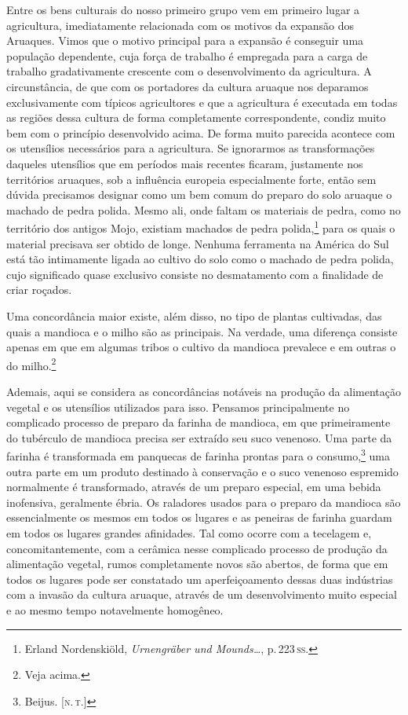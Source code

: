Entre os bens culturais do nosso primeiro grupo vem em primeiro lugar a
agricultura, imediatamente relacionada com os motivos da expansão dos
Aruaques. Vimos que o motivo principal para a expansão é conseguir uma
população dependente, cuja força de trabalho é empregada para a carga de
trabalho gradativamente crescente com o desenvolvimento da agricultura.
A circunstância, de que com os portadores da cultura aruaque nos
deparamos exclusivamente com típicos agricultores e que a agricultura é
executada em todas as regiões dessa cultura de forma completamente
correspondente, condiz muito bem com o princípio desenvolvido acima. De
forma muito parecida acontece com os utensílios necessários para a
agricultura. Se ignorarmos as transformações daqueles utensílios que em
períodos mais recentes ficaram, justamente nos territórios aruaques, sob
a influência europeia especialmente forte, então sem dúvida precisamos
designar como um bem comum do preparo do solo aruaque o machado de pedra
polida. Mesmo ali, onde faltam os materiais de pedra, como no território
dos antigos Mojo, existiam machados de pedra polida,\footnote{Erland
  Nordenskiöld, \textit{Urnengräber und Mounds\ldots}, p.\,223\,\textsc{ss}.} 
  para os quais o material precisava ser obtido de
longe. Nenhuma ferramenta na América do Sul está tão intimamente ligada
ao cultivo do solo como o machado de pedra polida, cujo significado
quase exclusivo consiste no desmatamento com a finalidade de criar
roçados.

Uma concordância maior existe, além disso, no tipo de plantas
cultivadas, das quais a mandioca e o milho são as principais. Na
verdade, uma diferença consiste apenas em que em algumas tribos o
cultivo da mandioca prevalece e em outras o do milho.\footnote{Veja
  acima.}

Ademais, aqui se considera as concordâncias notáveis na produção da
alimentação vegetal e os utensílios utilizados para isso. Pensamos
principalmente no complicado processo de preparo da farinha de
mandioca, em que primeiramente do tubérculo de mandioca precisa ser
extraído seu suco venenoso. Uma parte da farinha é transformada em
panquecas de farinha prontas para o consumo,\footnote{Beijus. {[}\textsc{n.\,t.}{]}} uma
outra parte em um produto destinado à conservação e o suco venenoso
espremido normalmente é transformado, através de um preparo especial, em
uma bebida inofensiva, geralmente ébria. Os raladores usados para o
preparo da mandioca são essencialmente os mesmos em todos os lugares e
as peneiras de farinha guardam em todos os lugares grandes afinidades.
Tal como ocorre com a tecelagem e, concomitantemente, com a cerâmica
nesse complicado processo de produção da alimentação vegetal, rumos
completamente novos são abertos, de forma que em todos os lugares pode
ser constatado um aperfeiçoamento dessas duas indústrias com a invasão
da cultura aruaque, através de um desenvolvimento muito especial e ao
mesmo tempo notavelmente homogêneo.

